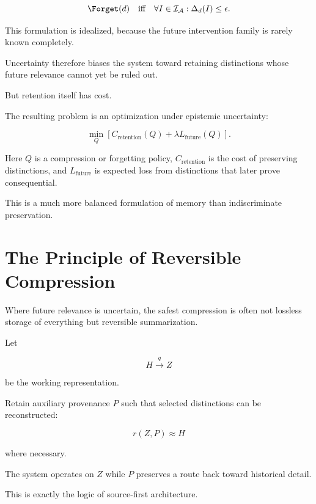 \documentclass[11pt]{article}
\theoremstyle{remark}
\newcommand{\Adm}{\mathcal{A}}
\begin{document}
\begin{equation}
\Forget(d)
\quad\text{iff}\quad
\forall I\in\mathcal{I}_{\Adm}
:
\Delta_d(I)\leq\epsilon.
\end{equation}

This formulation is idealized, because the future intervention family is rarely known completely.

Uncertainty therefore biases the system toward retaining distinctions whose future relevance cannot yet be ruled out.

But retention itself has cost.

The resulting problem is an optimization under epistemic uncertainty:

\begin{equation}
\min_Q
\left[
C_{\mathrm{retention}}(Q)
+
\lambda
L_{\mathrm{future}}(Q)
\right].
\end{equation}

Here $Q$ is a compression or forgetting policy, $C_{\mathrm{retention}}$ is the cost of preserving distinctions, and $L_{\mathrm{future}}$ is expected loss from distinctions that later prove consequential.

This is a much more balanced formulation of memory than indiscriminate preservation.

\section{The Principle of Reversible Compression}

Where future relevance is uncertain, the safest compression is often not lossless storage of everything but reversible summarization.

Let

\begin{equation}
H
\xrightarrow{q}
Z
\end{equation}

be the working representation.

Retain auxiliary provenance $P$ such that selected distinctions can be reconstructed:

\begin{equation}
r(Z,P)\approx H
\end{equation}

where necessary.

The system operates on $Z$ while $P$ preserves a route back toward historical detail.

This is exactly the logic of source-first architecture.
\end{document}
